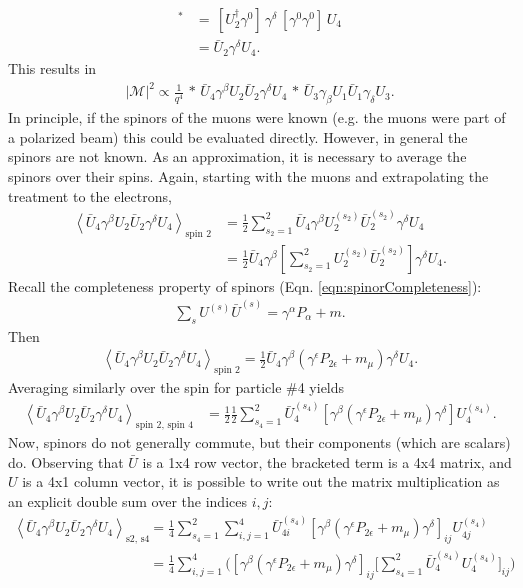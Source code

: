 \begin{align*}
[\bar{U}_4\gamma^\delta U_2]^*&=\,[U^\dagger _2 \gamma^0] \, \gamma^\delta \, [\gamma^0 \gamma^0] \, U_4\\
&=\bar{U}_2 \gamma^\delta U_4.
\end{align*}
This results in
\begin{align} \label{eqn:mottIntermediate}
|\mathcal{M}|^2 \propto \frac{1}{q^4} \, * \, \bar{U}_4\gamma^\beta U_2 \bar{U}_2 \gamma^\delta U_4 \, * \, \bar{U}_3\gamma_\beta U_1 \bar{U}_1 \gamma_\delta U_3.
\end{align}
In principle, if the spinors of the muons were known (e.g. the muons were part of a polarized beam) this could be evaluated directly. However, in general the spinors are not known. As an approximation, it is necessary to average the spinors over their spins. Again, starting with the muons and extrapolating the treatment to the electrons,
\begin{align*}
\left< \bar{U}_4 \gamma^\beta U_2 \bar{U}_2 \gamma^\delta U_4 \right> _\text{spin 2}
&= \frac{1}{2} \sum _{s_2 = 1} ^2 \bar{U}_4 \gamma^\beta U_2 ^{(s_2)} \bar{U}_2 ^{(s_2)} \gamma^\delta U_4\\
&= \frac{1}{2} \bar{U}_4 \gamma^\beta \left[ \sum _{s_2 = 1} ^2 U_2 ^{(s_2)} \bar{U}_2 ^{(s_2)} \right] \gamma^\delta U_4.
\end{align*}
Recall the completeness property of spinors (Eqn. \ref{eqn:spinorCompleteness}):
\begin{align*}
\sum _s U^{(s)}\bar{U}^{(s)} = \gamma^\alpha P_\alpha + m.
\end{align*}
Then
\begin{align*}
\left< \bar{U}_4 \gamma^\beta U_2 \bar{U}_2 \gamma^\delta U_4 \right> _\text{spin 2}
= \frac{1}{2} \bar{U}_4 \gamma^\beta (\gamma^\epsilon P_{2\epsilon}+m_\mu)\gamma^\delta U_4.
\end{align*}
Averaging similarly over the spin for particle \#4 yields
\begin{align*}
\left< \bar{U}_4 \gamma^\beta U_2 \bar{U}_2 \gamma^\delta U_4 \right> _\text{spin 2, spin 4}
&= \frac{1}{2} \frac{1}{2} \sum_{s_4=1} ^2 \bar{U}_4 ^{(s_4)} [\gamma^\beta (\gamma^\epsilon P_{2\epsilon}+m_\mu)\gamma^\delta] U_4 ^{(s_4)}.
\end{align*}
Now, spinors do not generally commute, but their components (which are scalars) do. Observing that $\bar{U}$ is a 1x4 row vector, the bracketed term is a 4x4 matrix, and $U$ is a 4x1 column vector, it is possible to write out the matrix multiplication as an explicit double sum over the indices $i,j$:
\begin{align*}
\left< \bar{U}_4 \gamma^\beta U_2 \bar{U}_2 \gamma^\delta U_4 \right> _\text{s2, s4}
&=\frac{1}{4}\sum_{s_4=1} ^2 \sum_{i,j=1} ^4 \bar{U}_{4i} ^{(s_4)} [\gamma^\beta(\gamma^\epsilon P_{2\epsilon}+m_\mu)\gamma^\delta]_{ij} U_{4j} ^{(s_4)}\\
&=\frac{1}{4}\sum_{i,j=1} ^4 \Big([\gamma^\beta(\gamma^\epsilon P_{2\epsilon}+m_\mu)\gamma^\delta]_{ij} \Big[ \sum_{s_4=1} ^2 \bar{U}_4 ^{(s_4)} U_4 ^{(s_4)}\Big]_{ij} \Big)
\end{align*}

